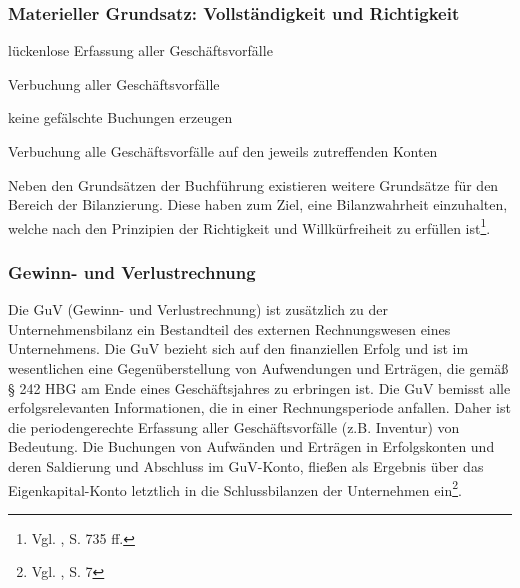 \subsubsection*{Materieller Grundsatz: Vollständigkeit und Richtigkeit}
\begin{compactitem}
\item  lückenlose Erfassung aller Geschäftsvorfälle
\item  Verbuchung aller Geschäftsvorfälle
\item  keine gefälschte Buchungen erzeugen
\item  Verbuchung alle Geschäftsvorfälle auf den jeweils zutreffenden Konten
\end{compactitem}
Neben den Grundsätzen der Buchführung existieren weitere Grundsätze für den Bereich der Bilanzierung. Diese haben zum Ziel, eine Bilanzwahrheit einzuhalten, welche nach den Prinzipien der Richtigkeit und Willkürfreiheit zu erfüllen ist\footnote{Vgl. \cite{Wohe2000}, S. 735 ff.}.

 

\subsubsection{Gewinn- und Verlustrechnung}
Die GuV (Gewinn- und Verlustrechnung) ist zusätzlich zu der Unternehmensbilanz ein Bestandteil des externen Rechnungswesen eines Unternehmens. Die GuV bezieht sich auf den finanziellen Erfolg und ist im wesentlichen eine Gegenüberstellung von Aufwendungen und Erträgen, die gemäß § 242 HBG am Ende eines Geschäftsjahres zu erbringen ist.
Die GuV bemisst alle erfolgsrelevanten Informationen, die in einer Rechnungsperiode anfallen. Daher ist die periodengerechte Erfassung aller Geschäftsvorfälle (z.B. Inventur) von Bedeutung. Die Buchungen von Aufwänden und Erträgen in Erfolgskonten und deren Saldierung und Abschluss im GuV-Konto, fließen als Ergebnis über das Eigenkapital-Konto letztlich in die Schlussbilanzen der Unternehmen ein\footnote{Vgl. \cite{Schuler2006}, S. 7}.


